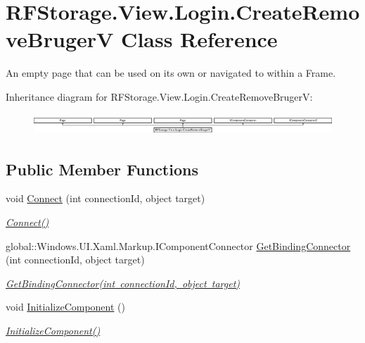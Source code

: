 \hypertarget{class_r_f_storage_1_1_view_1_1_login_1_1_create_remove_bruger_v}{}\section{R\+F\+Storage.\+View.\+Login.\+Create\+Remove\+BrugerV Class Reference}
\label{class_r_f_storage_1_1_view_1_1_login_1_1_create_remove_bruger_v}


An empty page that can be used on its own or navigated to within a Frame.  


Inheritance diagram for R\+F\+Storage.\+View.\+Login.\+Create\+Remove\+BrugerV\+:\begin{figure}[H]
\begin{center}
\leavevmode
\includegraphics[height=0.794326cm]{class_r_f_storage_1_1_view_1_1_login_1_1_create_remove_bruger_v}
\end{center}
\end{figure}
\subsection*{Public Member Functions}
\begin{DoxyCompactItemize}
\item 
void \mbox{\hyperlink{class_r_f_storage_1_1_view_1_1_login_1_1_create_remove_bruger_v_a797546394ebe1579ec8b64e239fb2fe7}{Connect}} (int connection\+Id, object target)
\begin{DoxyCompactList}\small\item\em \mbox{\hyperlink{class_r_f_storage_1_1_view_1_1_login_1_1_create_remove_bruger_v_a797546394ebe1579ec8b64e239fb2fe7}{Connect()}} \end{DoxyCompactList}\item 
global\+::\+Windows.\+U\+I.\+Xaml.\+Markup.\+I\+Component\+Connector \mbox{\hyperlink{class_r_f_storage_1_1_view_1_1_login_1_1_create_remove_bruger_v_ab7e9d9835e1b23bd9e7fdc5d3fa6e032}{Get\+Binding\+Connector}} (int connection\+Id, object target)
\begin{DoxyCompactList}\small\item\em \mbox{\hyperlink{class_r_f_storage_1_1_view_1_1_login_1_1_create_remove_bruger_v_ab7e9d9835e1b23bd9e7fdc5d3fa6e032}{Get\+Binding\+Connector(int connection\+Id, object target)}} \end{DoxyCompactList}\item 
void \mbox{\hyperlink{class_r_f_storage_1_1_view_1_1_login_1_1_create_remove_bruger_v_a42c2c1e840fc876877b68fb4798b98ea}{Initialize\+Component}} ()
\begin{DoxyCompactList}\small\item\em \mbox{\hyperlink{class_r_f_storage_1_1_view_1_1_login_1_1_create_remove_bruger_v_a42c2c1e840fc876877b68fb4798b98ea}{Initialize\+Component()}} \end{DoxyCompactList}\end{DoxyCompactItemize}


